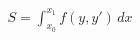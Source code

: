 \documentclass[preview]{standalone}
\begin{document}
\begin{align*}
S = \int_{x_0}^{x_1} f(y, y') \, dx
\end{align*}
\end{document}

